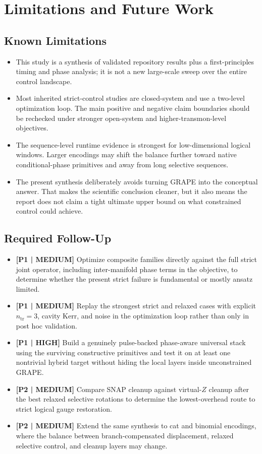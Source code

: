 \documentclass[11pt]{article}
\begin{document}
\section{Limitations and Future Work}

\subsection{Known Limitations}
\begin{itemize}
\item This study is a synthesis of validated repository results plus a first-principles timing and phase analysis; it is not a new large-scale sweep over the entire control landscape.
\item Most inherited strict-control studies are closed-system and use a two-level optimization loop. The main positive and negative claim boundaries should be rechecked under stronger open-system and higher-transmon-level objectives.
\item The sequence-level runtime evidence is strongest for low-dimensional logical windows. Larger encodings may shift the balance further toward native conditional-phase primitives and away from long selective sequences.
\item The present synthesis deliberately avoids turning GRAPE into the conceptual answer. That makes the scientific conclusion cleaner, but it also means the report does not claim a tight ultimate upper bound on what constrained control could achieve.
\end{itemize}

\subsection{Required Follow-Up}
\begin{itemize}
\item \textbf{[P1 | MEDIUM]} Optimize composite families directly against the full strict joint operator, including inter-manifold phase terms in the objective, to determine whether the present strict failure is fundamental or mostly ansatz limited.
\item \textbf{[P1 | MEDIUM]} Replay the strongest strict and relaxed cases with explicit $n_{\mathrm{tr}}=3$, cavity Kerr, and noise in the optimization loop rather than only in post hoc validation.
\item \textbf{[P1 | HIGH]} Build a genuinely pulse-backed phase-aware universal stack using the surviving constructive primitives and test it on at least one nontrivial hybrid target without hiding the local layers inside unconstrained GRAPE.
\item \textbf{[P2 | MEDIUM]} Compare SNAP cleanup against virtual-$Z$ cleanup after the best relaxed selective rotations to determine the lowest-overhead route to strict logical gauge restoration.
\item \textbf{[P2 | MEDIUM]} Extend the same synthesis to cat and binomial encodings, where the balance between branch-compensated displacement, relaxed selective control, and cleanup layers may change.
\end{itemize}
\end{document}
